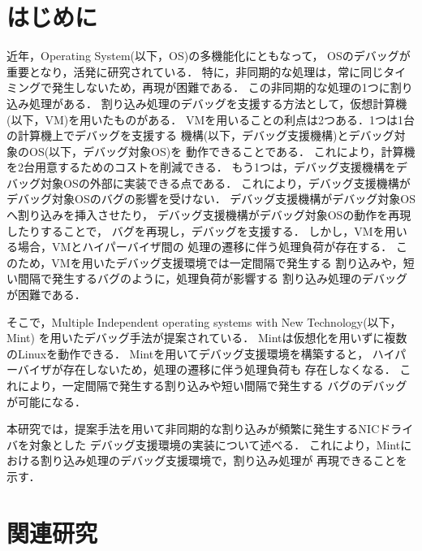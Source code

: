 \documentclass[tanilab-enum]{graduate}
\begin{document}
\chapter{はじめに}\label{chap:introduction}
近年，Operating System(以下，OS)の多機能化にともなって，
OSのデバッグが重要となり，活発に研究されている．
特に，非同期的な処理は，常に同じタイミングで発生しないため，再現が困難である．
この非同期的な処理の1つに割り込み処理がある．
割り込み処理のデバッグを支援する方法として，仮想計算機(以下，VM)を用いたものがある．
VMを用いることの利点は2つある．1つは1台の計算機上でデバッグを支援する
機構(以下，デバッグ支援機構)とデバッグ対象のOS(以下，デバッグ対象OS)を
動作できることである．
これにより，計算機を2台用意するためのコストを削減できる．
もう1つは，デバッグ支援機構をデバッグ対象OSの外部に実装できる点である．
これにより，デバッグ支援機構がデバッグ対象OSのバグの影響を受けない．
デバッグ支援機構がデバッグ対象OSへ割り込みを挿入させたり，
デバッグ支援機構がデバッグ対象OSの動作を再現したりすることで，
バグを再現し，デバッグを支援する．
しかし，VMを用いる場合，VMとハイパーバイザ間の
処理の遷移に伴う処理負荷が存在する．
このため，VMを用いたデバッグ支援環境では一定間隔で発生する
割り込みや，短い間隔で発生するバグのように，処理負荷が影響する
割り込み処理のデバッグが困難である．

そこで，Multiple Independent operating systems with New Technology(以下，Mint)\cite{senzaki}
を用いたデバッグ手法が提案されている．
Mintは仮想化を用いずに複数のLinuxを動作できる．
Mintを用いてデバッグ支援環境を構築すると，
ハイパーバイザが存在しないため，処理の遷移に伴う処理負荷も
存在しなくなる．
これにより，一定間隔で発生する割り込みや短い間隔で発生する
バグのデバッグが可能になる．

本研究では，提案手法を用いて非同期的な割り込みが頻繁に発生するNICドライバを対象とした
デバッグ支援環境の実装について述べる．
これにより，Mintにおける割り込み処理のデバッグ支援環境で，割り込み処理が
再現できることを示す．
\chapter{関連研究}\label{chap:kanren}
\end{document}
